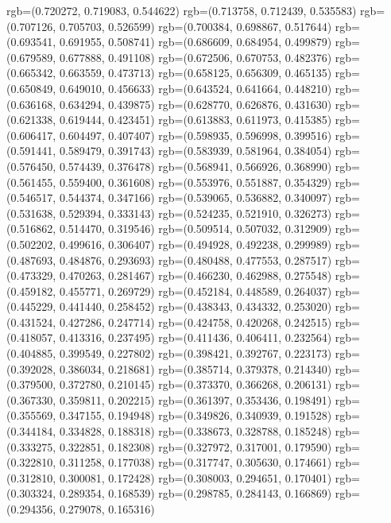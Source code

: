 {{{					rgb=(0.720272, 0.719083, 0.544622)
					rgb=(0.713758, 0.712439, 0.535583)
					rgb=(0.707126, 0.705703, 0.526599)
					rgb=(0.700384, 0.698867, 0.517644)
					rgb=(0.693541, 0.691955, 0.508741)
					rgb=(0.686609, 0.684954, 0.499879)
					rgb=(0.679589, 0.677888, 0.491108)
					rgb=(0.672506, 0.670753, 0.482376)
					rgb=(0.665342, 0.663559, 0.473713)
					rgb=(0.658125, 0.656309, 0.465135)
					rgb=(0.650849, 0.649010, 0.456633)
					rgb=(0.643524, 0.641664, 0.448210)
					rgb=(0.636168, 0.634294, 0.439875)
					rgb=(0.628770, 0.626876, 0.431630)
					rgb=(0.621338, 0.619444, 0.423451)
					rgb=(0.613883, 0.611973, 0.415385)
					rgb=(0.606417, 0.604497, 0.407407)
					rgb=(0.598935, 0.596998, 0.399516)
					rgb=(0.591441, 0.589479, 0.391743)
					rgb=(0.583939, 0.581964, 0.384054)
					rgb=(0.576450, 0.574439, 0.376478)
					rgb=(0.568941, 0.566926, 0.368990)
					rgb=(0.561455, 0.559400, 0.361608)
					rgb=(0.553976, 0.551887, 0.354329)
					rgb=(0.546517, 0.544374, 0.347166)
					rgb=(0.539065, 0.536882, 0.340097)
					rgb=(0.531638, 0.529394, 0.333143)
					rgb=(0.524235, 0.521910, 0.326273)
					rgb=(0.516862, 0.514470, 0.319546)
					rgb=(0.509514, 0.507032, 0.312909)
					rgb=(0.502202, 0.499616, 0.306407)
					rgb=(0.494928, 0.492238, 0.299989)
					rgb=(0.487693, 0.484876, 0.293693)
					rgb=(0.480488, 0.477553, 0.287517)
					rgb=(0.473329, 0.470263, 0.281467)
					rgb=(0.466230, 0.462988, 0.275548)
					rgb=(0.459182, 0.455771, 0.269729)
					rgb=(0.452184, 0.448589, 0.264037)
					rgb=(0.445229, 0.441440, 0.258452)
					rgb=(0.438343, 0.434332, 0.253020)
					rgb=(0.431524, 0.427286, 0.247714)
					rgb=(0.424758, 0.420268, 0.242515)
					rgb=(0.418057, 0.413316, 0.237495)
					rgb=(0.411436, 0.406411, 0.232564)
					rgb=(0.404885, 0.399549, 0.227802)
					rgb=(0.398421, 0.392767, 0.223173)
					rgb=(0.392028, 0.386034, 0.218681)
					rgb=(0.385714, 0.379378, 0.214340)
					rgb=(0.379500, 0.372780, 0.210145)
					rgb=(0.373370, 0.366268, 0.206131)
					rgb=(0.367330, 0.359811, 0.202215)
					rgb=(0.361397, 0.353436, 0.198491)
					rgb=(0.355569, 0.347155, 0.194948)
					rgb=(0.349826, 0.340939, 0.191528)
					rgb=(0.344184, 0.334828, 0.188318)
					rgb=(0.338673, 0.328788, 0.185248)
					rgb=(0.333275, 0.322851, 0.182308)
					rgb=(0.327972, 0.317001, 0.179590)
					rgb=(0.322810, 0.311258, 0.177038)
					rgb=(0.317747, 0.305630, 0.174661)
					rgb=(0.312810, 0.300081, 0.172428)
					rgb=(0.308003, 0.294651, 0.170401)
					rgb=(0.303324, 0.289354, 0.168539)
					rgb=(0.298785, 0.284143, 0.166869)
					rgb=(0.294356, 0.279078, 0.165316)
}}}
